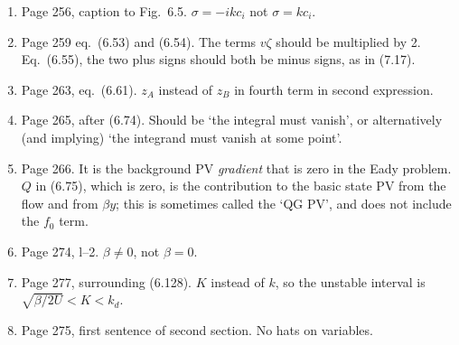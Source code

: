 \documentclass[10pt]{article}
\newcommand{\eq}{eq.\ } \newcommand{\Eq}{Eq.\ }
\begin{document}
\begin{enumerate}

\item Page 256, caption to Fig.\ 6.5. $\sigma = -i k c_i$ not $\sigma = kc_i$.


\item Page 259 \eq (6.53) and (6.54). The terms $v \zeta$ should be multiplied by 2. \\ Eq.\ (6.55), the two plus signs should both be minus signs, as in (7.17).


\item Page 263, \eq (6.61). $z_A$ instead of $z_B$ in fourth term in second expression.

\item Page 265, after (6.74). Should be `the integral must vanish', or alternatively (and implying) `the integrand must vanish at some point'.


\item Page 266. It is the background PV \emph{gradient} that is zero in the Eady problem. $Q$ in (6.75), which is zero, is the contribution to the basic state PV from the flow and from $\beta y$; this is sometimes called the `QG PV', and does not include the $f_0$ term.




\item Page 274, l--2. $\beta \neq 0$, not $\beta = 0$.

\item Page 277, surrounding (6.128). $K$ instead of $k$, so the unstable interval is $\sqrt{\beta/2U} < K < k_d$.

\item Page 275, first sentence of second section. No hats on variables.


\end{enumerate}
\end{document}
